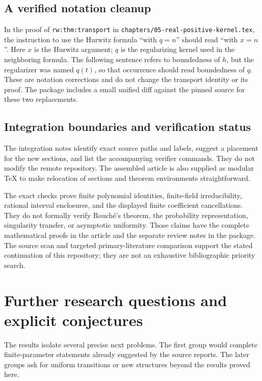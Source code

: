 \documentclass[11pt]{article}
\numberwithin{equation}{section}
\theoremstyle{definition}
\theoremstyle{remark}
\begin{document}
\subsection{A verified notation cleanup}

In the proof of \texttt{rw:thm:transport} in
\nolinkurl{chapters/05-real-positive-kernel.tex}, the instruction to
use the Hurwitz formula ``with $q=n$'' should read ``with $x=n$''.
Here $x$ is the Hurwitz argument; $q$ is the regularizing kernel used
in the neighboring formula. The following sentence refers to boundedness
of $h$, but the regularizer was named $q(t)$, so that occurrence should
read boundedness of $q$. These are notation corrections and do not
change the transport identity or its proof. The package includes a
small unified diff against the pinned source for these two replacements.

\subsection{Integration boundaries and verification status}

The integration notes identify exact source paths and labels, suggest
a placement for the new sections, and list the accompanying verifier
commands. They do not modify the remote repository. The assembled
article is also supplied as modular TeX to make relocation of sections
and theorem environments straightforward.

The exact checks prove finite polynomial identities, finite-field
irreducibility, rational interval enclosures, and the displayed finite
coefficient cancellations. They do not formally verify Rouch\'e's
theorem, the probability representation, singularity transfer, or
asymptotic uniformity. Those claims have the complete mathematical
proofs in the article and the separate review notes in the package.
The source scan and targeted primary-literature comparison support
the stated continuation of this repository; they are not an exhaustive
bibliographic priority search.


\section{Further research questions and explicit conjectures}
\label{sec:research-agenda}

The results isolate several precise next problems. The first group
would complete finite-parameter statements already suggested by the
source reports. The later groups ask for uniform transitions or new
structures beyond the results proved here.
\end{document}
